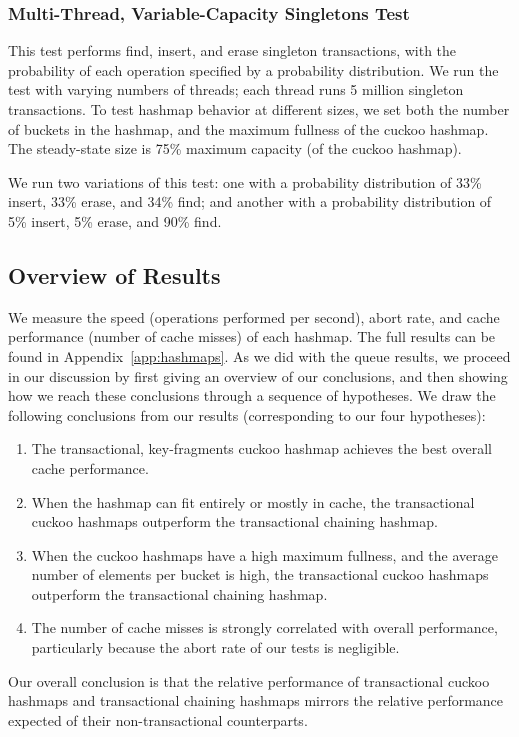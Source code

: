 \subsubsection{Multi-Thread, Variable-Capacity Singletons Test} 

This test performs find, insert, and erase singleton transactions, with the probability of each operation specified by a probability distribution. 
We run the test with varying numbers of threads; each thread runs 5 million singleton transactions. To test hashmap behavior at different sizes, we set both the number of buckets in the hashmap, and the maximum fullness of the cuckoo hashmap. The steady-state size is 75\% maximum capacity (of the cuckoo hashmap). 

We run two variations of this test: one with a probability distribution of 33\% insert, 33\% erase, and 34\% find; and another with a probability distribution of 5\% insert, 5\% erase, and 90\% find. 

\subsection{Overview of Results}

We measure the speed (operations performed per second), abort rate, and cache performance (number of cache misses) of each hashmap.  The full results can be found in Appendix~\ref{app:hashmaps}. As we did with the queue results, we proceed in our discussion by first giving an overview of our conclusions, and then showing how we reach these conclusions through a sequence of hypotheses. We draw the following conclusions from our results (corresponding to our four hypotheses):
\begin{enumerate}
    \item The transactional, key-fragments cuckoo hashmap achieves the best overall cache performance. 
    \item When the hashmap can fit entirely or mostly in cache, the transactional cuckoo hashmaps outperform the transactional chaining hashmap.
    \item When the cuckoo hashmaps have a high maximum fullness, and the average number of elements per bucket is high, the transactional cuckoo hashmaps outperform the transactional chaining hashmap.
    \item The number of cache misses is strongly correlated with overall performance, particularly because the abort rate of our tests is negligible.
\end{enumerate}
Our overall conclusion is that the relative performance of transactional cuckoo hashmaps and transactional chaining hashmaps mirrors the relative performance expected of their non-transactional counterparts.

